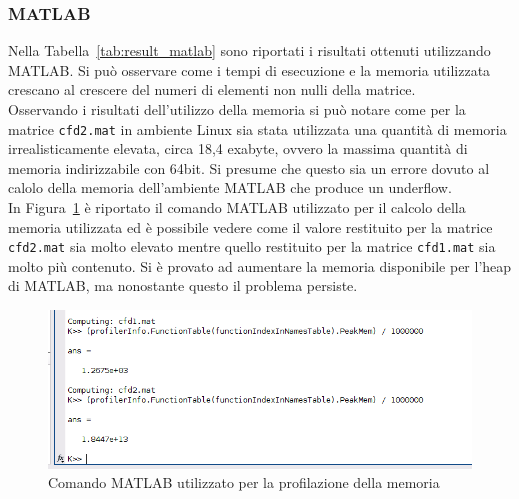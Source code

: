 \documentclass[a4paper, 12pt]{article}
\begin{document}
\subsubsection{MATLAB}
Nella Tabella~\ref{tab:result_matlab} sono riportati i risultati ottenuti
utilizzando MATLAB.
Si può osservare come i tempi di esecuzione e la memoria utilizzata crescano al
crescere del numeri di elementi non nulli della matrice.\\
Osservando i risultati dell'utilizzo della memoria si può notare come per la
matrice \texttt{cfd2.mat} in ambiente Linux sia stata utilizzata una quantità di
memoria irrealisticamente elevata, circa 18,4 exabyte, ovvero la massima
quantità di memoria indirizzabile con 64bit.
Si presume che questo sia un errore dovuto al calolo della memoria dell'ambiente
MATLAB che produce un underflow.\\
In Figura~\ref{fig:matlab_overflow} è riportato il comando MATLAB utilizzato
per il calcolo della memoria utilizzata ed è possibile vedere come il valore
restituito per la matrice \texttt{cfd2.mat} sia molto elevato mentre quello
restituito per la matrice \texttt{cfd1.mat} sia molto più contenuto.
Si è provato ad aumentare la memoria disponibile per l'heap di MATLAB,
ma nonostante questo il problema persiste.
\begin{figure}[ht]
\includegraphics[width=\textwidth]{matlab_overflow}
\caption{Comando MATLAB utilizzato per la profilazione della memoria}
\label{fig:matlab_overflow}
\end{figure}\\
\end{document}
